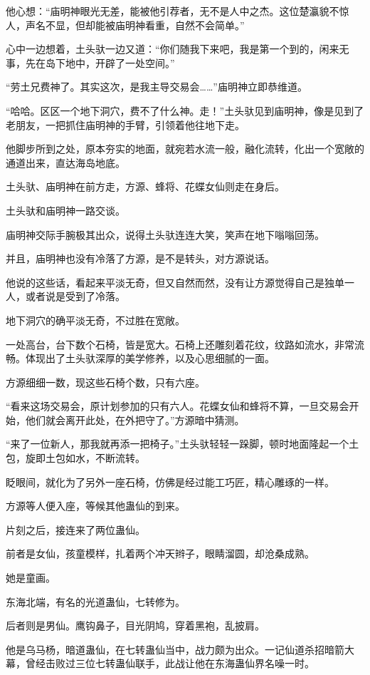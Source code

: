 \begin{this_body}
他心想：“庙明神眼光无差，能被他引荐者，无不是人中之杰。这位楚瀛貌不惊人，声名不显，但却能被庙明神看重，自然不会简单。”

心中一边想着，土头驮一边又道：“你们随我下来吧，我是第一个到的，闲来无事，先在岛下地中，开辟了一处空间。”

“劳土兄费神了。其实这次，是我主导交易会……”庙明神立即恭维道。

“哈哈。区区一个地下洞穴，费不了什么神。走！”土头驮见到庙明神，像是见到了老朋友，一把抓住庙明神的手臂，引领着他往地下走。

他脚步所到之处，原本夯实的地面，就宛若水流一般，融化流转，化出一个宽敞的通道出来，直达海岛地底。

土头驮、庙明神在前方走，方源、蜂将、花蝶女仙则走在身后。

土头驮和庙明神一路交谈。

庙明神交际手腕极其出众，说得土头驮连连大笑，笑声在地下嗡嗡回荡。

并且，庙明神也没有冷落了方源，是不是转头，对方源说话。

他说的这些话，看起来平淡无奇，但又自然而然，没有让方源觉得自己是独单一人，或者说是受到了冷落。

地下洞穴的确平淡无奇，不过胜在宽敞。

一处高台，台下数个石椅，皆是宽大。石椅上还雕刻着花纹，纹路如流水，非常流畅。体现出了土头驮深厚的美学修养，以及心思细腻的一面。

方源细细一数，现这些石椅个数，只有六座。

“看来这场交易会，原计划参加的只有六人。花蝶女仙和蜂将不算，一旦交易会开始，他们就会离开此处，在外把守了。”方源暗中猜测。

“来了一位新人，那我就再添一把椅子。”土头驮轻轻一跺脚，顿时地面隆起一个土包，旋即土包如水，不断流转。

眨眼间，就化为了另外一座石椅，仿佛是经过能工巧匠，精心雕琢的一样。

方源等人便入座，等候其他蛊仙的到来。

片刻之后，接连来了两位蛊仙。

前者是女仙，孩童模样，扎着两个冲天辫子，眼睛溜圆，却沧桑成熟。

她是童画。

东海北端，有名的光道蛊仙，七转修为。

后者则是男仙。鹰钩鼻子，目光阴鸠，穿着黑袍，乱披肩。

他是乌马杨，暗道蛊仙，在七转蛊仙当中，战力颇为出众。一记仙道杀招暗箭大幕，曾经击败过三位七转蛊仙联手，此战让他在东海蛊仙界名噪一时。


\end{this_body}
